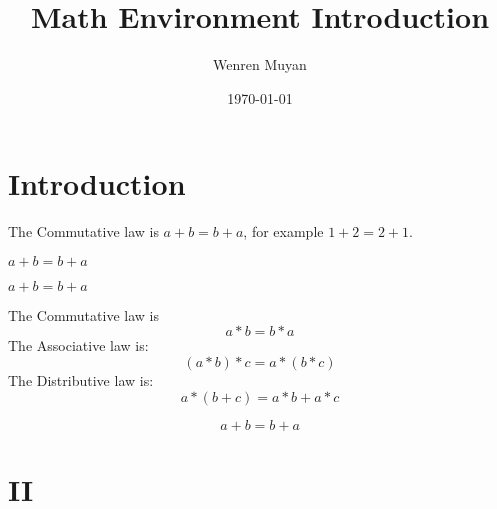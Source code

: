 \documentclass{article}
\title{Math Environment Introduction}
\author{Wenren Muyan}
\date{\today}
\begin{document}
    \maketitle
    \tableofcontents

    \section{Introduction}
        The Commutative law is $a+b=b+a$, for example $1+2=2+1$. \par
        \(a+b=b+a\)\par
        \begin{math}a+b=b+a\end{math}


        The Commutative law is
        $$
            a*b=b*a
        $$
        The Associative law is:
        \[
            (a*b)*c=a*(b*c)
        \]
        The Distributive law is:
        \begin{displaymath}
            a*(b+c)=a*b+a*c
        \end{displaymath}

        \begin{equation}
            a+b=b+a \label{eq:commutative}
        \end{equation}

    \section{II}
\end{document}
